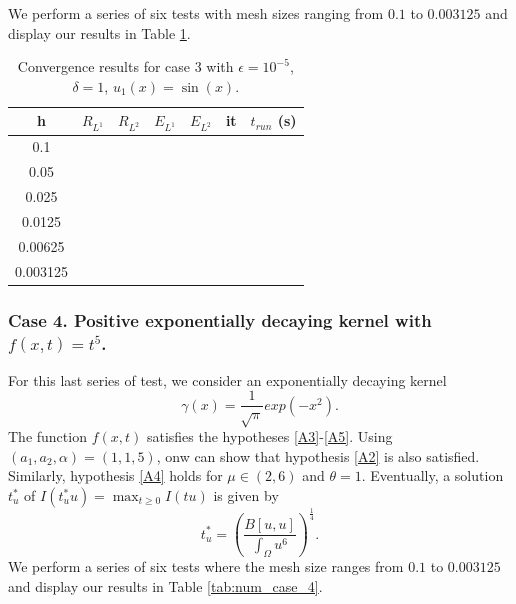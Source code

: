 \documentclass[11pt]{amsart}   	%
\theoremstyle{plain}
\numberwithin{equation}{section}
\begin{document}
We perform a series of six tests with mesh sizes ranging from $0.1$ to $0.003125$ and display our results in Table \ref{tab:num_case_3}.

\begin{table}[H]
    \centering
    \caption{Convergence results for case 3 with $\epsilon=10^{-5}$, $\delta=1$, $u_1(x)=\sin(x)$.}%
    \begin{tabular}{|c||c|c||c|c||c|c|}
    \hline
    h & $R_{L^1}$ & $R_{L^2} $  & $E_{L^1}$ & $E_{L^2}$ & it & $t_{run}$ (s)
    \\ \hline
    0.1 &  &  & & & &
    \\ \hline
    0.05 & & & & & &
    \\ \hline
    0.025 & & & & & &    
    \\ \hline
    0.0125 & & & & & &
    \\ \hline
    0.00625 & & & & & &    
    \\ \hline
    0.003125 & & & & & & 
    \\ \hline  
    \end{tabular}
    \label{tab:num_case_3}
\end{table}

\subsubsection{Case 4. Positive exponentially decaying kernel with $f(x,t)=t^5$.}
For this last series of test, we consider an exponentially decaying kernel
$$\gamma(x) = \frac{1}{\sqrt{\pi}} exp(-x^2). $$
The function $f(x,t)$ satisfies the hypotheses \ref{A3}-\ref{A5}. Using  $(a_1,a_2,\alpha)=(1,1,5)$, onw can show that hypothesis \ref{A2} is also satisfied. Similarly, hypothesis \ref{A4} holds for $\mu\in(2,6)$ and $\theta=1$.
Eventually, a solution $t^*_u$ of $I(t^*_u u)  = \max_{t\geq 0} I(tu)$ is given by
$$t^*_u = \left( \frac{B[u,u]}{\int_\Omega u^6} \right)^{\frac{1}{4}}.$$
We perform a series of six tests where the mesh size ranges from $0.1$ to $0.003125$ and display our results in Table \ref{tab:num_case_4}.
\end{document}
